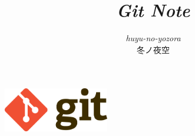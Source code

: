 \documentclass[10pt,a4j,openany,dvipdfmx]{jsarticle}
\title{{\it Git Note}}
\author{{\it huyu-no-yozora }\\冬ノ夜空}
\date{\todaye}
\begin{document}
\maketitle
\vspace{0.8cm}
\begin{center}
\includegraphics[width=4.6cm]{./figure/Git-Logo-2Color.png}
\end{center}
\vspace{0.8cm}

\tableofcontents

\newpage



\newpage







\end{document}

